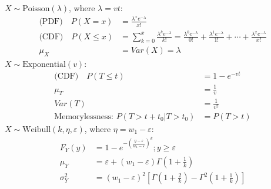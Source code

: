 \documentclass[10pt,twoside]{article}
\newcommand{\lt}{\left}
\newcommand{\rt}{\right}
\newcommand{\?}{\stackrel{?}{=}}
\newcommand{\fr}{\frac}
\newcommand{\la}{\lambda}
\begin{document}
$X \sim \text{Poisson} (\la)$, where $\la = vt$:
\begin{align}
   \text{(PDF)} \quad P(X = x) &= \fr{\la^x e^{-\la}}{x!} \\
  \text{(CDF)} \quad  P(X\le x) &= \sum_{k=0}^x\fr{\la^k e^{-\la}}{k!}
  = \fr{\la^0 e^{-\la}}{0!} +  \fr{\la^1 e^{-\la}}{1!} + \cdots + \fr{\la^x e^{-\la}}{x!}\\
  \mu_X &= Var(X) = \la
\end{align}
$X \sim \text{Exponential}(v)$:
\begin{align}
  \text{(CDF)} \quad  P(T\le t) &= 1 - e^{-vt} \\
  \mu_T &= \fr{1}{v}\\
  Var(T) &= \fr{1}{v^2} \\
\text{Memorylessness: }  P(T> t+t_0|T > t_0) &= P(T> t)
\end{align}
$X \sim \text{Weibull}(k,\eta,\varepsilon)$, where $\eta = w_1 - \varepsilon$:
\begin{align}
    F_{Y}(y) &= 1  - e^{-\lt(\fr{y-\varepsilon}{w_1 - \varepsilon}\rt)^k}; y\ge\varepsilon \\
    \mu_Y &= \varepsilon + (w_1 - \varepsilon)\Gamma\lt(1 + \fr1k\rt) \\
    \sigma_Y^2 &= (w_1 - \varepsilon)^2\lt[ \Gamma\lt(1 + \fr2k\rt) - \Gamma^2\lt(1 + \fr1k\rt)\rt]
\end{align}

\end{document}

